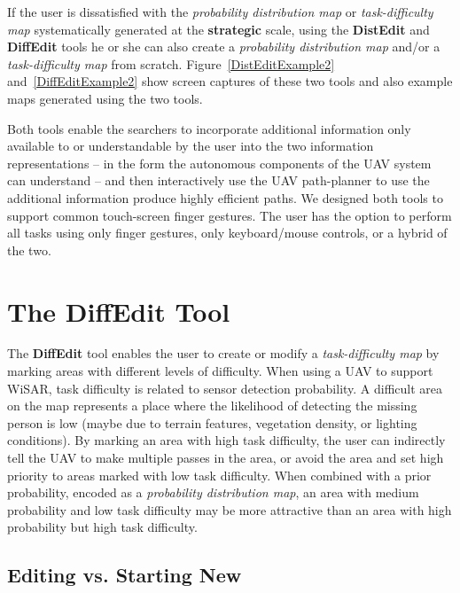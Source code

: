 If the user is dissatisfied with the \textit{probability distribution map} or \textit{task-difficulty map} systematically generated at the \textbf{strategic} scale, using the \textbf{DistEdit} and \textbf{DiffEdit} tools he or she can also create a \textit{probability distribution map} and/or a \textit{task-difficulty map} from scratch. Figure~\ref{DistEditExample2} and~\ref{DiffEditExample2} show screen captures of these two tools and also example maps generated using the two tools.

Both tools enable the searchers to incorporate additional information only available to or understandable by the user into the two information representations -- in the form the autonomous components of the UAV system can understand -- and then interactively use the UAV path-planner to use the additional information produce highly efficient paths. We designed both tools to support common touch-screen finger gestures. The user has the option to perform all tasks using only finger gestures, only keyboard/mouse controls, or a hybrid of the two.

\section{The DiffEdit Tool}
\label{DiffEdit}

The \textbf{DiffEdit} tool enables the user to create or modify a \textit{task-difficulty map} by marking areas with different levels of difficulty. When using a UAV to support WiSAR, task difficulty is related to sensor detection probability. A difficult area on the map represents a place where the likelihood of detecting the missing person is low (maybe due to terrain features, vegetation density, or lighting conditions). By marking an area with high task difficulty, the user can indirectly tell the UAV to make multiple passes in the area, or avoid the area and set high priority to areas marked with low task difficulty. When combined with a prior probability, encoded as a \textit{probability distribution map}, an area with medium probability and low task difficulty may be more attractive than an area with high probability but high task difficulty.

\subsection{Editing vs. Starting New}

